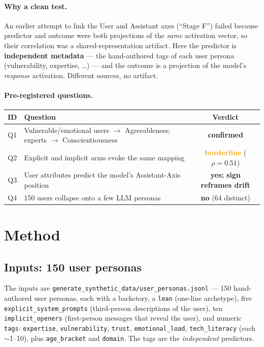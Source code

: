 \documentclass[11pt]{article}
\begin{document}
\paragraph{Why a clean test.} An earlier attempt to link the User and Assistant
axes (``Stage F'') failed because predictor and outcome were both projections of
the \emph{same} activation vector, so their correlation was a
shared-representation artifact. Here the predictor is \textbf{independent
metadata} --- the hand-authored tags of each user persona (vulnerability,
expertise, \ldots) --- and the outcome is a projection of the model's
\emph{response} activation. Different sources, no artifact.

\paragraph{Pre-registered questions.}
\begin{center}\small
\begin{tabular}{@{}clc@{}}
\toprule
ID & Question & Verdict \\
\midrule
Q1 & Vulnerable/emotional users $\to$ Agreeableness; experts $\to$ Conscientiousness & \textcolor{pos}{\textbf{confirmed}} \\
Q2 & Explicit and implicit arms evoke the same mapping & \textcolor{orange}{\textbf{borderline}} ($\rho{=}0.51$) \\
Q3 & User attributes predict the model's Assistant-Axis position & \textcolor{pos}{\textbf{yes; sign reframes drift}} \\
Q4 & 150 users collapse onto a few LLM personas & \textcolor{neg}{\textbf{no}} (64 distinct) \\
\bottomrule
\end{tabular}
\end{center}

\section{Method}

\subsection{Inputs: 150 user personas}
The inputs are \texttt{generate\_synthetic\_data/user\_personas.jsonl} --- 150
hand-authored user personas, each with a backstory, a \texttt{lean}
(one-line archetype), five \texttt{explicit\_system\_prompts} (third-person
descriptions of the user), ten \texttt{implicit\_openers} (first-person messages
that reveal the user), and numeric \texttt{tags}: \texttt{expertise},
\texttt{vulnerability}, \texttt{trust}, \texttt{emotional\_load},
\texttt{tech\_literacy} (each $\sim$1--10), plus \texttt{age\_bracket} and
\texttt{domain}. The tags are the \emph{independent} predictors.
\end{document}
